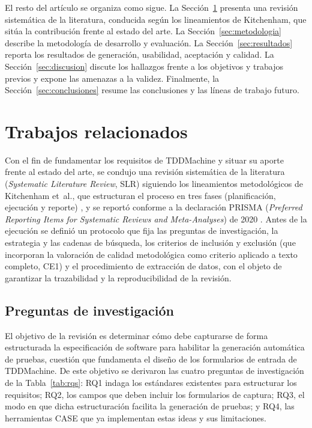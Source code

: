 \documentclass[10pt,journal,twoside,letterpaper]{IEEEtran}
\begin{document}
    El resto del artículo se organiza como sigue. La Sección~\ref{sec:trabajos} presenta una revisión sistemática de la literatura, conducida según los lineamientos de Kitchenham, que sitúa la contribución frente al estado del arte. La Sección~\ref{sec:metodologia} describe la metodología de desarrollo y evaluación. La Sección~\ref{sec:resultados} reporta los resultados de generación, usabilidad, aceptación y calidad. La Sección~\ref{sec:discusion} discute los hallazgos frente a los objetivos y trabajos previos y expone las amenazas a la validez. Finalmente, la Sección~\ref{sec:conclusiones} resume las conclusiones y las líneas de trabajo futuro.
    
    \section{Trabajos relacionados}
    \label{sec:trabajos}
    
    Con el fin de fundamentar los requisitos de TDDMachine y situar su aporte frente al estado del arte, se condujo una revisión sistemática de la literatura (\emph{Systematic Literature Review}, SLR) siguiendo los lineamientos metodológicos de Kitchenham et~al., que estructuran el proceso en tres fases (planificación, ejecución y reporte) \cite{kitchenham2009slr}, y se reportó conforme a la declaración PRISMA (\emph{Preferred Reporting Items for Systematic Reviews and Meta-Analyses}) de 2020 \cite{prisma2020}. Antes de la ejecución se definió un protocolo que fija las preguntas de investigación, la estrategia y las cadenas de búsqueda, los criterios de inclusión y exclusión (que incorporan la valoración de calidad metodológica como criterio aplicado a texto completo, CE1) y el procedimiento de extracción de datos, con el objeto de garantizar la trazabilidad y la reproducibilidad de la revisión.
    
    \subsection{Preguntas de investigación}
    \label{subsec:rqs}
    
    El objetivo de la revisión es determinar cómo debe capturarse de forma estructurada la especificación de software para habilitar la generación automática de pruebas, cuestión que fundamenta el diseño de los formularios de entrada de TDDMachine. De este objetivo se derivaron las cuatro preguntas de investigación de la Tabla~\ref{tab:rqs}: RQ1 indaga los estándares existentes para estructurar los requisitos; RQ2, los campos que deben incluir los formularios de captura; RQ3, el modo en que dicha estructuración facilita la generación de pruebas; y RQ4, las herramientas CASE que ya implementan estas ideas y sus limitaciones.
    
\end{document}
